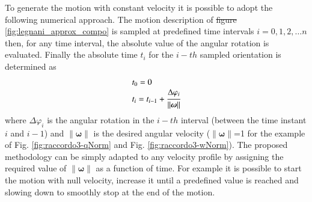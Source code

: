 \documentclass[preprint, 12pt]{elsarticle}
\def\vect#1{{\boldsymbol{#1}}}
\newcommand{\norm}[1]{\left\lVert#1\right\rVert}
\providecommand{\DIFadd}[1]{{\protect\color{blue}\uwave{#1}}} %
\providecommand{\DIFdel}[1]{{\protect\color{red}\sout{#1}}}                      %
\providecommand{\DIFaddbegin}{} %
\providecommand{\DIFaddend}{} %
\providecommand{\DIFdelbegin}{} %
\providecommand{\DIFdelend}{} %
\begin{document}
To generate the motion with constant velocity it is possible to adopt the following numerical approach. The motion description of \DIFdelbegin \DIFdel{figure }\DIFdelend \DIFaddbegin \DIFadd{Figure }\DIFaddend \ref{fig:legnani_approx_compo} is sampled at predefined time intervals $i=0, 1, 2,\ldots n$ then, for any time interval, the absolute value of the angular rotation is evaluated. Finally the absolute time $t_i$ for the $i-th$ sampled orientation is determined as
\begin{equation}
    \begin{array}{l}
        t_0=0\\
        t_i=t_{i-1}+\cfrac{\Delta\varphi_i}{\norm{\vect{\omega}}}
    \end{array}
    \DIFaddbegin \label{eq:deltaT}
\DIFaddend \end{equation}
where $\Delta\varphi_i$ is the angular rotation in the $i-th$ interval (between the time instant $i$ and $i-1$) and $\norm{\vect{\omega}}$ is the desired angular velocity ($\norm{\vect{\omega}}$=1 for the example of Fig. \ref{fig:raccordo3-qNorm} and Fig. \ref{fig:raccordo3-wNorm}). The proposed methodology can be simply adapted to any velocity profile by assigning the required value of $\norm{\vect{\omega}}$ as a function of time. For example it is possible to start the motion with null velocity, increase it until a predefined value is reached and slowing down to smoothly stop at the end of the motion.
\end{document}
